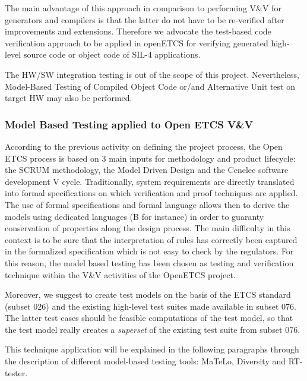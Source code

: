 \documentclass{template/openetcs_report}
\begin{document}
The  main advantage of this approach in comparison to performing V\&V for
generators and compilers is that the latter do not have to be
re-verified after improvements and extensions. Therefore we advocate
the test-based code verification approach to be applied in openETCS
for verifying generated high-level source code or object code of SIL-4
applications. 


The HW/SW integration testing is out of the scope of this
project. Nevertheless, Model-Based Testing of Compiled Object Code
or/and  Alternative Unit test on target HW may also be performed.


\subsubsection{Model Based Testing applied to Open ETCS V\&V}
According to the previous activity on defining the project process, 
the Open ETCS process is based on 3 main inputs for methodology and 
product lifecycle: the SCRUM methodology, the Model Driven Design and the
 Cenelec software development V cycle.
Traditionally, system requirements are directly translated into formal specifications
 on which verification and proof techniques are applied. The use of formal 
specifications and formal language allows then to derive the models using dedicated
 languages (B for instance) in order to guaranty conservation of properties along 
the design process. The main difficulty in this context is to be sure that the
 interpretation of rules has correctly been captured in the formalized specification
 which is not easy to check by the regulators. For this reason, the model based testing
 has been chosen as testing and verification technique within the V\&V activities of
 the OpenETCS project. 

Moreover, we suggest to create test models on the basis of the ETCS standard (subset 026) and
the existing high-level test suites made available in subset 076. The latter test cases should 
be feasible computations of the test model, so that the test model really creates a {\it superset}
of the existing test suite from subset 076.



This technique application will be explained in the following
 paragraphs through the description of different model-based testing tools: 
MaTeLo, Diversity and RT-tester. 
\end{document}
